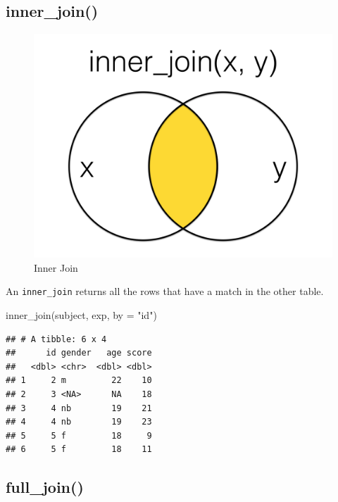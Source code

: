 \documentclass[
  oneside]{book}
\newenvironment{Shaded}{\begin{snugshade}}{\end{snugshade}}
\newcommand{\AttributeTok}[1]{\textcolor[rgb]{0.77,0.63,0.00}{#1}}
\newcommand{\FunctionTok}[1]{\textcolor[rgb]{0.00,0.00,0.00}{#1}}
\newcommand{\NormalTok}[1]{#1}
\newcommand{\StringTok}[1]{\textcolor[rgb]{0.31,0.60,0.02}{#1}}
\begin{document}
\hypertarget{inner_join}{%
\subsection{inner\_join()}\label{inner_join}}

\begin{figure}

{\centering \includegraphics[width=1\linewidth]{images/joins/inner_join} 

}

\caption{Inner Join}\label{fig:img-inner-join}
\end{figure}

An \texttt{inner\_join} returns all the rows that have a match in the other table.

\begin{Shaded}
\begin{Highlighting}[]
\FunctionTok{inner\_join}\NormalTok{(subject, exp, }\AttributeTok{by =} \StringTok{"id"}\NormalTok{)}
\end{Highlighting}
\end{Shaded}

\begin{verbatim}
## # A tibble: 6 x 4
##      id gender   age score
##   <dbl> <chr>  <dbl> <dbl>
## 1     2 m         22    10
## 2     3 <NA>      NA    18
## 3     4 nb        19    21
## 4     4 nb        19    23
## 5     5 f         18     9
## 6     5 f         18    11
\end{verbatim}

\hypertarget{full_join}{%
\subsection{full\_join()}\label{full_join}}
\end{document}
